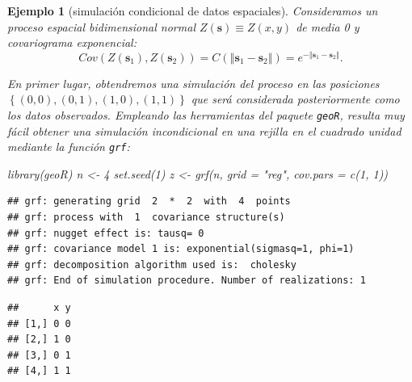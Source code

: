 \documentclass[
]{book}
\newenvironment{Shaded}{\begin{snugshade}}{\end{snugshade}}
\newcommand{\AttributeTok}[1]{\textcolor[rgb]{0.77,0.63,0.00}{#1}}
\newcommand{\CommentTok}[1]{\textcolor[rgb]{0.56,0.35,0.01}{\textit{#1}}}
\newcommand{\DecValTok}[1]{\textcolor[rgb]{0.00,0.00,0.81}{#1}}
\newcommand{\FunctionTok}[1]{\textcolor[rgb]{0.00,0.00,0.00}{#1}}
\newcommand{\NormalTok}[1]{#1}
\newcommand{\OtherTok}[1]{\textcolor[rgb]{0.56,0.35,0.01}{#1}}
\newcommand{\SpecialCharTok}[1]{\textcolor[rgb]{0.00,0.00,0.00}{#1}}
\newcommand{\StringTok}[1]{\textcolor[rgb]{0.31,0.60,0.02}{#1}}
\theoremstyle{break}
\newtheorem{example}{Ejemplo}[chapter]
\theoremstyle{nonumberplain}
\renewcommand{\CommentTok}[1]{\textcolor[rgb]{0.41,0.41,0.41}{\texttt{#1}}}
\begin{document}
\begin{example}[simulación condicional de datos espaciales]

Consideramos un proceso espacial bidimensional normal
\(Z(\mathbf{s})\equiv Z(x,y)\) de media 0 y covariograma
exponencial:
\[Cov(Z(\mathbf{s}_1),Z(\mathbf{s}_2)) 
= C(\left\Vert \mathbf{s}_1-\mathbf{s}_2\right\Vert )
= e^{-\left\Vert \mathbf{s}_1-\mathbf{s}_2\right\Vert }.\]

En primer lugar, obtendremos una simulación del proceso en las posiciones
\(\left\{(0,0),(0,1),(1,0),(1,1)\right\}\) que será considerada posteriormente
como los datos observados.
Empleando las herramientas del paquete \texttt{geoR}, resulta muy fácil obtener
una simulación incondicional en una rejilla en el cuadrado unidad
mediante la función \texttt{grf}:

\begin{Shaded}
\begin{Highlighting}[]
\FunctionTok{library}\NormalTok{(geoR)}
\NormalTok{n }\OtherTok{\textless{}{-}} \DecValTok{4}
\FunctionTok{set.seed}\NormalTok{(}\DecValTok{1}\NormalTok{)}
\NormalTok{z }\OtherTok{\textless{}{-}} \FunctionTok{grf}\NormalTok{(n, }\AttributeTok{grid =} \StringTok{"reg"}\NormalTok{, }\AttributeTok{cov.pars =} \FunctionTok{c}\NormalTok{(}\DecValTok{1}\NormalTok{, }\DecValTok{1}\NormalTok{))}
\end{Highlighting}
\end{Shaded}

\begin{verbatim}
## grf: generating grid  2  *  2  with  4  points
## grf: process with  1  covariance structure(s)
## grf: nugget effect is: tausq= 0 
## grf: covariance model 1 is: exponential(sigmasq=1, phi=1)
## grf: decomposition algorithm used is:  cholesky 
## grf: End of simulation procedure. Number of realizations: 1
\end{verbatim}

\begin{Shaded}
\end{Shaded}

\begin{verbatim}
##      x y
## [1,] 0 0
## [2,] 1 0
## [3,] 0 1
## [4,] 1 1
\end{verbatim}

\begin{Shaded}
\end{Shaded}


\end{example}
\end{document}
